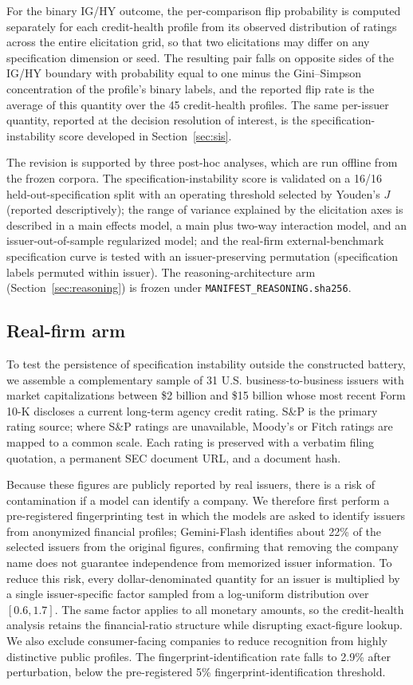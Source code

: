 \documentclass[a4paper,fleqn]{cas-sc}
\begin{document}
For the binary IG/HY outcome, the per-comparison flip probability is computed separately for each
credit-health profile from its observed distribution of ratings across the entire elicitation grid, so
that two elicitations may differ on any specification dimension or seed. The resulting pair falls on
opposite sides of the IG/HY boundary with probability equal to one minus the Gini--Simpson concentration
of the profile's binary labels, and the reported flip rate is the average of this quantity over the 45
credit-health profiles. The same per-issuer quantity, reported at the decision resolution of interest, is
the specification-instability score developed in Section~\ref{sec:sis}.

The revision is supported by three post-hoc analyses, which are run offline from the frozen corpora. The
specification-instability score is validated on a 16/16 held-out-specification split with an operating
threshold selected by Youden's $J$ (reported descriptively); the range of variance explained by the
elicitation axes is described in a main effects model, a main plus two-way interaction model, and an
issuer-out-of-sample regularized model; and the real-firm external-benchmark specification curve is tested
with an issuer-preserving permutation (specification labels permuted within issuer). The
reasoning-architecture arm (Section~\ref{sec:reasoning}) is frozen under \texttt{MANIFEST\_REASONING.sha256}.

\subsection{Real-firm arm}
To test the persistence of specification instability outside the constructed battery, we assemble a
complementary sample of 31 U.S. business-to-business issuers with market capitalizations between \$2
billion and \$15 billion whose most recent Form 10-K discloses a current long-term agency credit rating.
S\&P is the primary rating source; where S\&P ratings are unavailable, Moody's or Fitch ratings are
mapped to a common scale. Each rating is preserved with a verbatim filing quotation, a permanent SEC
document URL, and a document hash.

Because these figures are publicly reported by real issuers, there is a risk of contamination if a model
can identify a company. We therefore first perform a pre-registered fingerprinting test in which the
models are asked to identify issuers from anonymized financial profiles; Gemini-Flash identifies about
22\% of the selected issuers from the original figures, confirming that removing the company name does not
guarantee independence from memorized issuer information. To reduce this risk, every dollar-denominated
quantity for an issuer is multiplied by a single issuer-specific factor sampled from a log-uniform
distribution over $[0.6,1.7]$. The same factor applies to all monetary amounts, so the credit-health
analysis retains the financial-ratio structure while disrupting exact-figure lookup. We also
exclude consumer-facing companies to reduce recognition from highly distinctive public profiles. The
fingerprint-identification rate falls to 2.9\% after perturbation, below the pre-registered 5\%
fingerprint-identification threshold.
\end{document}

